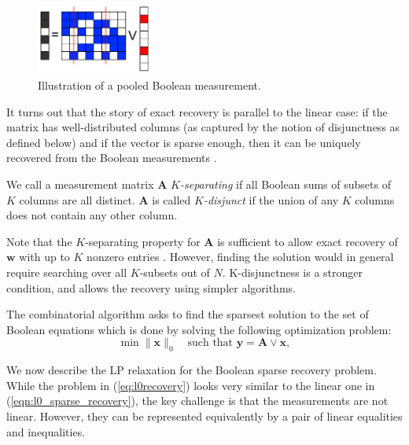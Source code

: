 \begin{figure}[!thb]
\centering
\includegraphics[width=1.5in]{./fig_group_test.pdf}
\caption{  Illustration of a pooled Boolean measurement.}
\label{fig:group_testing}
\end{figure}

It turns out that the story of exact recovery is parallel to the linear case:
if the matrix has well-distributed columns (as captured by the notion of disjunctness as 
defined below) and if the vector is sparse enough, then it can be uniquely recovered from the
Boolean measurements \cite{group_testing}.

\begin{definition}
We call a measurement matrix $\mathbf{A}$ {\em $K$-separating}
if all Boolean sums of subsets of $K$ columns are all distinct.
$\mathbf{A}$ is called {\em $K$-disjunct} if the union of any
$K$ columns does not contain any other column.
\end{definition}

Note that the $K$-separating property for $\mathbf{A}$ is sufficient
to allow exact recovery of $\mathbf{w}$ with up to $K$ nonzero entries
\cite{book2_group_testing}. However, finding the solution would
in general require searching over all $K$-subsets out of $N$. K-disjunctness
is a stronger condition, and allows the recovery using simpler algorithms.

The combinatorial algorithm asks to find the sparsest solution to the
set of Boolean equations which is done by solving the following optimization problem:
\begin{equation}
\label{eq:l0recovery}
	\min \|\mathbf{x}\|_0 \quad {\textrm{such that }}\mathbf{y} = \mathbf{A} \lor \mathbf{x},
\end{equation}

We now describe the LP relaxation for the Boolean sparse recovery problem. While
the problem in (\ref{eq:l0recovery}) looks very similar to the linear one in
(\ref{eqn:l0_sparse_recovery}), the key challenge is that the measurements are not linear. However, they can be represented equivalently by a pair of linear equalities and inequalities.

